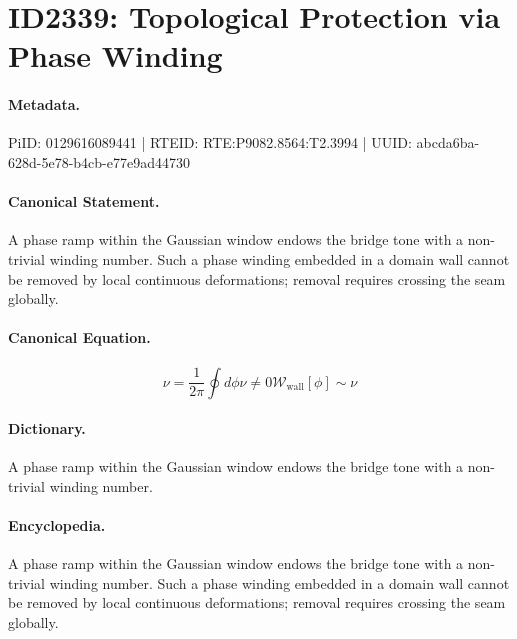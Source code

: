 \section*{ID2339: Topological Protection via Phase Winding}
\paragraph{Metadata.}
PiID: 0129616089441 | RTEID: RTE:P9082.8564:T2.3994 | UUID: abcda6ba-628d-5e78-b4cb-e77e9ad44730

\paragraph{Canonical Statement.}
A phase ramp within the Gaussian window endows the bridge tone with a non-trivial winding number. Such a phase winding embedded in a domain wall cannot be removed by local continuous deformations; removal requires crossing the seam globally.

\paragraph{Canonical Equation.}
\[
\nu=\frac{1}{2\pi}\oint d\phi \nu\neq 0 \mathcal{W}_{\mathrm{wall}}[\phi]\sim \nu
\]

\paragraph{Dictionary.}
A phase ramp within the Gaussian window endows the bridge tone with a non-trivial winding number.

\paragraph{Encyclopedia.}
A phase ramp within the Gaussian window endows the bridge tone with a non-trivial winding number. Such a phase winding embedded in a domain wall cannot be removed by local continuous deformations; removal requires crossing the seam globally.
